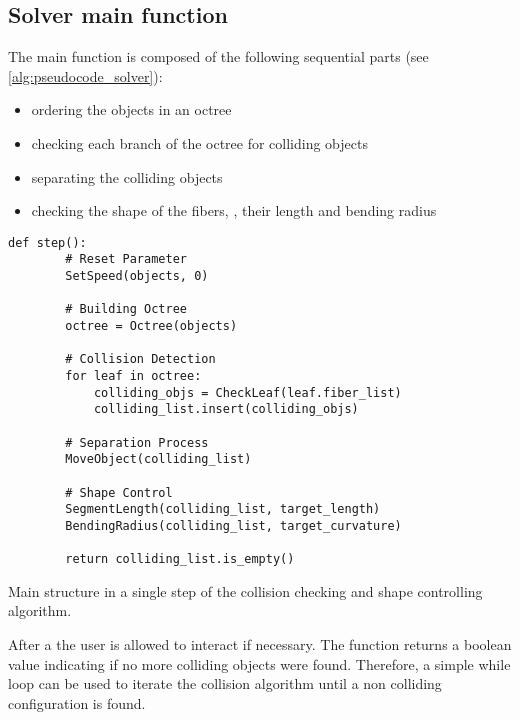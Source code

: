 \subsection{Solver main function}
%
The main function is composed of the following sequential parts (see \cref{alg:pseudocode_solver}):
% 
\begin{itemize}
    \item ordering the objects in an octree
    \item checking each branch of the octree for colliding objects
    \item separating the colliding objects
    \item checking the shape of the fibers, \ie{}, their length and bending radius
\end{itemize}
% 
\begin{lstfloat}[!tb]
    \lstset{style=python}
    \begin{lstlisting}[]
    def step():
        # Reset Parameter
        SetSpeed(objects, 0)
       
        # Building Octree
        octree = Octree(objects)
       
        # Collision Detection
        for leaf in octree:
            colliding_objs = CheckLeaf(leaf.fiber_list)
            colliding_list.insert(colliding_objs)
    
        # Separation Process
        MoveObject(colliding_list)
    
        # Shape Control
        SegmentLength(colliding_list, target_length)
        BendingRadius(colliding_list, target_curvature)
    
        return colliding_list.is_empty()
    \end{lstlisting}
    \caption[]{Main structure in a single step of the collision checking and shape controlling algorithm.}
    \label{alg:pseudocode_solver}
\end{lstfloat}
% 
After a  the user is allowed to interact if necessary.
The function returns a boolean value indicating if no more colliding objects were found.
Therefore, a simple while loop can be used to iterate the collision algorithm until a non colliding configuration is found.
%
%
%
